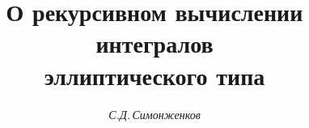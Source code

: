 

 




 


\newcommand{\const}{\operatorname{const}} 


\renewcommand{\baselinestretch}{0.96}


\newcommand{\tts}[1]{} 


 




 


\setcounter{page}{27} 












\author{\it С.Д.\,Симонженков} 




\title{О рекурсивном вычислении интегралов\\ 


эллиптического типа} 


 


\date{} 




\pagestyle{plain} %


 




\maketitle 


